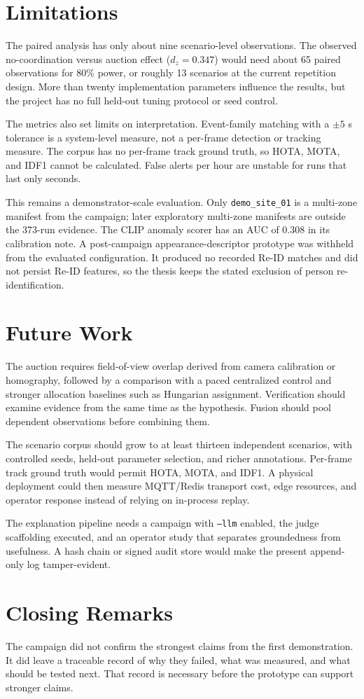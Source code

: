 \section{Limitations}

The paired analysis has only about nine scenario-level observations. The
observed no-coordination versus auction effect ($d_z=0.347$) would need about
65 paired observations for 80\% power, or roughly 13 scenarios at the current
repetition design. More than twenty implementation parameters influence the
results, but the project has no full held-out tuning protocol or seed control.

The metrics also set limits on interpretation. Event-family matching with a
$\pm5$ s tolerance is a system-level measure, not a per-frame detection or
tracking measure. The corpus has no per-frame track ground truth, so HOTA,
MOTA, and IDF1 cannot be calculated. False alerts per hour are unstable for
runs that last only seconds.

This remains a demonstrator-scale evaluation. Only \texttt{demo\_site\_01}
is a multi-zone manifest from the campaign; later exploratory multi-zone
manifests are outside the 373-run evidence. The CLIP anomaly scorer has an AUC
of 0.308 in its calibration note. A post-campaign appearance-descriptor
prototype was withheld from the evaluated configuration. It produced no
recorded Re-ID matches and did not persist Re-ID features, so the thesis keeps
the stated exclusion of person re-identification.

\section{Future Work}

The auction requires field-of-view overlap derived from camera calibration or
homography, followed by a comparison with a paced centralized control and
stronger allocation baselines such as Hungarian assignment. Verification
should examine evidence from the same time as the hypothesis. Fusion should
pool dependent observations before combining them.

The scenario corpus should grow to at least thirteen independent scenarios,
with controlled seeds, held-out parameter selection, and richer annotations.
Per-frame track ground truth would permit HOTA, MOTA, and IDF1. A physical
deployment could then measure MQTT/Redis transport cost, edge resources, and
operator response instead of relying on in-process replay.

The explanation pipeline needs a campaign with \texttt{--llm} enabled, the
judge scaffolding executed, and an operator study that separates groundedness
from usefulness. A hash chain or signed audit store would make the present
append-only log tamper-evident.

\section{Closing Remarks}

The campaign did not confirm the strongest claims from the first
demonstration. It did leave a traceable record of why they failed, what was
measured, and what should be tested next. That record is necessary before the
prototype can support stronger claims.
